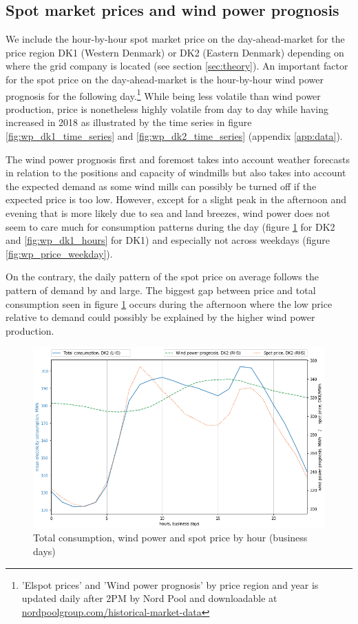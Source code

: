 \subsection{Spot market prices and wind power prognosis}
\label{subsec:d_spot}
We include the hour-by-hour spot market price on the day-ahead-market for the price region DK1 (Western Denmark) or DK2 (Eastern Denmark) depending on where the grid company is located (see section \ref{sec:theory}). An important factor for the spot price on the day-ahead-market is the hour-by-hour wind power prognosis for the following day.\footnote{'Elspot prices' and 'Wind power prognosis' by price region and year is updated daily after 2PM by Nord Pool and downloadable at \href{https://www.nordpoolgroup.com/historical-market-data/}{nordpoolgroup.com/historical-market-data}} While being less volatile than wind power production, price is nonetheless highly volatile from day to day while having increased in 2018 as illustrated by the time series in figure \ref{fig:wp_dk1_time_series} and \ref{fig:wp_dk2_time_series} (appendix \ref{app:data}).
\par
The wind power prognosis first and foremost takes into account weather forecasts in relation to the positions and capacity of windmills but also takes into account the expected demand as some wind mills can possibly be turned off if the expected price is too low. However, except for a slight peak in the afternoon and evening that is more likely due to sea and land breezes, wind power does not seem to care much for consumption patterns during the day (figure \ref{fig:trio_DK2_hours} for DK2 and \ref{fig:wp_dk1_hours} for DK1) and especially not across weekdays (figure \ref{fig:wp_price_weekday}).
\par
On the contrary, the daily pattern of the spot price on average follows the pattern of demand by and large. The biggest gap between price and total consumption seen in figure \ref{fig:trio_DK2_hours} occurs during the afternoon where the low price relative to demand could possibly be explained by the higher wind power production.
\begin{figure}[H]
  \centering
  \caption{Total consumption, wind power and spot price by hour (business days)}
  \label{fig:trio_DK2_hours}
    \includegraphics[width=1 \textwidth]{03_figures/trio_DK2_hours, business days}
\end{figure}


